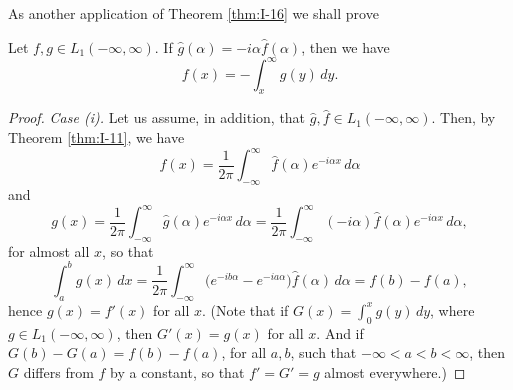 As another application of Theorem \ref{thm:I-16} we shall prove

\begin{theorem}\label{thm:I-17}
Let $f,g\in L_1(-\infty,\infty)$. If $\widehat g(\alpha)=-i\alpha\widehat f(\alpha)$, then we have
\begin{equation*}
f(x)=-\int_{x}^{\infty}g(y)\,dy.
\end{equation*}
\end{theorem}

\begin{proof}
\emph{Case (i).} Let us assume, in addition, that $\widehat g,\widehat f\in L_1(-\infty,\infty)$. Then, by Theorem \ref{thm:I-11}, we have
\begin{equation*}
f(x)=\frac{1}{2\pi}\int_{-\infty}^{\infty}\widehat f(\alpha)e^{-i\alpha x}\,d\alpha
\end{equation*}
and
\begin{equation*}
g(x)=\frac{1}{2\pi}\int_{-\infty}^{\infty}\widehat g(\alpha)e^{-i\alpha x}\,d\alpha
=\frac{1}{2\pi}\int_{-\infty}^{\infty}(-i\alpha)\widehat f(\alpha)e^{-i\alpha x}\,d\alpha,
\end{equation*}
for almost all $x$, so that
\begin{equation*}
\int_{a}^{b}g(x)\,dx
=\frac{1}{2\pi}\int_{-\infty}^{\infty}\bigl(e^{-ib\alpha}-e^{-ia\alpha}\bigr)\widehat f(\alpha)\,d\alpha
=f(b)-f(a),
\end{equation*}
hence $g(x)=f'(x)$ for all $x$. (Note that if $G(x)=\int_0^x g(y)\,dy$, where $g\in L_1(-\infty,\infty)$, then $G'(x)=g(x)$ for all $x$. And if $G(b)-G(a)=f(b)-f(a)$, for all $a,b$, such that $-\infty<a<b<\infty$, then $G$ differs from $f$ by a constant, so that $f'=G'=g$ almost everywhere.)


\end{proof}
